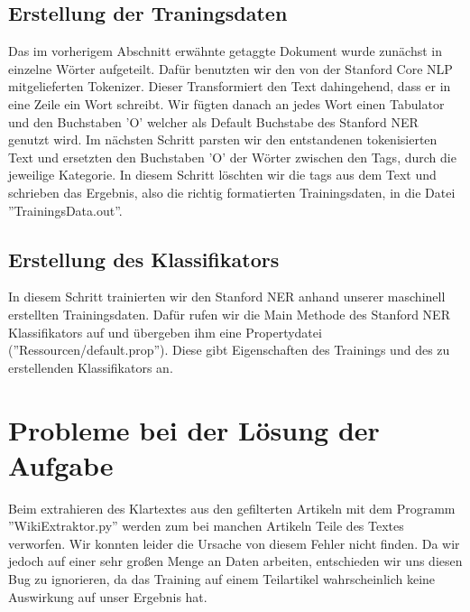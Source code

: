 \documentclass[a4paper]{article}
\begin{document}
\subsection{Erstellung der Traningsdaten}
Das im vorherigem Abschnitt erwähnte getaggte Dokument wurde zunächst in einzelne Wörter aufgeteilt. Dafür benutzten wir den von der Stanford Core NLP mitgelieferten Tokenizer. Dieser Transformiert den Text dahingehend, dass er in eine Zeile ein Wort schreibt. Wir fügten danach an jedes Wort einen Tabulator und den Buchstaben 'O' welcher als Default Buchstabe des Stanford NER genutzt wird.
Im nächsten Schritt parsten wir den entstandenen tokenisierten Text und ersetzten den Buchstaben 'O' der Wörter zwischen den Tags, durch die jeweilige Kategorie. In diesem Schritt löschten wir die tags aus dem Text und schrieben das Ergebnis, also die richtig formatierten Trainingsdaten, in die Datei ''TrainingsData.out''.

\subsection{Erstellung des Klassifikators}
In diesem Schritt trainierten wir den Stanford NER anhand unserer maschinell erstellten Trainingsdaten. Dafür rufen wir die Main Methode des Stanford NER Klassifikators auf und übergeben ihm eine Propertydatei (''Ressourcen/default.prop''). Diese gibt Eigenschaften des Trainings und des zu erstellenden Klassifikators an.

\section{Probleme bei der Lösung der Aufgabe}
	Beim extrahieren des Klartextes aus den gefilterten Artikeln mit dem Programm ''WikiExtraktor.py'' werden zum bei manchen Artikeln Teile des Textes verworfen. 
	Wir konnten leider die Ursache von diesem Fehler nicht finden. 
	Da wir jedoch auf einer sehr großen Menge an Daten arbeiten, entschieden wir uns diesen Bug zu ignorieren, da das Training auf einem Teilartikel wahrscheinlich keine Auswirkung auf unser Ergebnis hat.
	
\end{document}
